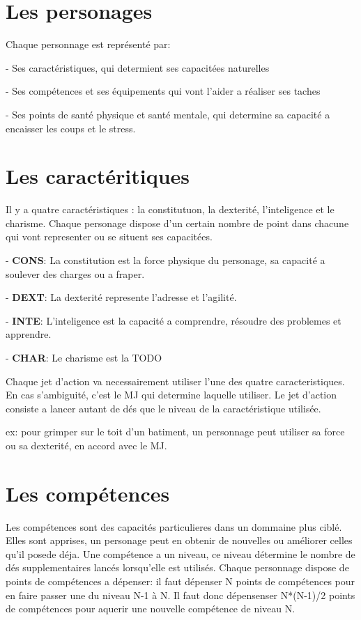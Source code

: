\section{Les personages} 

Chaque personnage est représenté par:

- Ses caractéristiques, qui determient ses capacitées naturelles

- Ses compétences et ses équipements qui vont l'aider a réaliser ses taches

- Ses points de santé physique et santé mentale, qui determine sa capacité a encaisser les coups et le stress. 


\section{Les caractéritiques}

Il y a quatre caractéristiques : la constitutuon, la dexterité, l'inteligence et le charisme. Chaque personage dispose d'un certain nombre de point dans chacune qui vont representer ou se situent ses capacitées.

- \textbf{CONS}: La constitution est la force physique du personage, sa capacité a soulever des charges ou a fraper.

- \textbf{DEXT}: La dexterité represente l'adresse et l'agilité.

- \textbf{INTE}: L'inteligence est la capacité a comprendre, résoudre des problemes et apprendre.

- \textbf{CHAR}: Le charisme est la TODO

Chaque jet d'action va necessairement utiliser l'une des quatre caracteristiques. En cas s'ambiguité, c'est le MJ qui determine laquelle utiliser. Le jet d'action consiste a lancer autant de dés que le niveau de la caractéristique utilisée.
	
ex: pour grimper sur le toit d'un batiment, un personnage peut utiliser sa force ou sa dexterité, en accord avec le MJ. 

\section{Les compétences}

Les compétences sont des capacités particulieres dans un dommaine plus ciblé. Elles sont apprises, un personage peut en obtenir de nouvelles ou améliorer celles qu'il posede déja. Une compétence a un niveau, ce niveau détermine le nombre de dés supplementaires lancés lorsqu'elle est utilisés.
Chaque personnage dispose de points de compétences a dépenser: il faut dépenser N points de compétences pour en faire passer une du niveau N-1 à N. Il faut donc dépensenser N*(N-1)/2 points de compétences pour aquerir une nouvelle compétence de niveau N.

